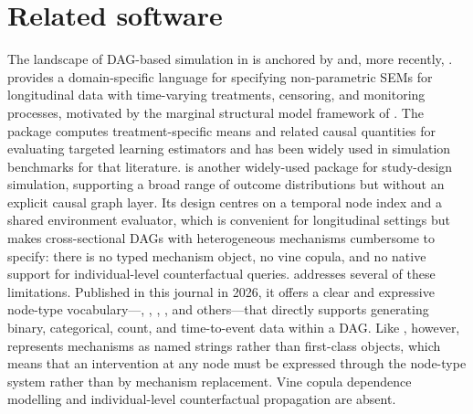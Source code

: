 \documentclass[article]{jss}
\begin{document}
\section{Related software}
\label{sec:related}

The landscape of DAG-based simulation in  is anchored by
 \citep{sofrygin2017simcausal} and, more recently,
 \citep{denz2026simdag}.  provides a
domain-specific language for specifying non-parametric SEMs for longitudinal data
with time-varying treatments, censoring, and monitoring processes, motivated by
the marginal structural model framework of \citet{robins2000marginal}.
The package computes treatment-specific means and related causal quantities for
evaluating targeted learning estimators \citep{laan2018targeted} and has been
widely used in simulation benchmarks for that literature. 
\citep{goldfeld2020simstudy} is another widely-used  package for
study-design simulation, supporting a broad range of outcome distributions but
without an explicit causal graph layer. Its design centres on a
temporal node index and a shared  environment evaluator, which is
convenient for longitudinal settings but makes cross-sectional DAGs with
heterogeneous mechanisms cumbersome to specify: there is no typed mechanism object,
no vine copula, and no native support for individual-level counterfactual queries.
 \citep{denz2026simdag} addresses several of these limitations.
Published in this journal in 2026, it offers a clear and expressive node-type
vocabulary---, , ,
, and others---that directly supports generating binary, categorical,
count, and time-to-event data within a DAG. Like , however,
 represents mechanisms as named strings rather than first-class
objects, which means that an intervention at any node must be expressed through the
node-type system rather than by mechanism replacement. Vine copula dependence
modelling and individual-level counterfactual propagation are absent.
\end{document}
